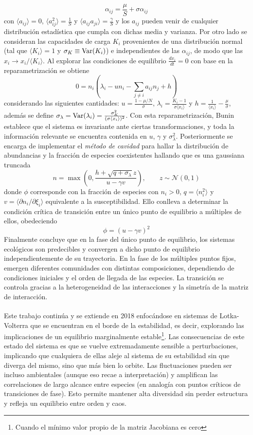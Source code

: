 $$\alpha_{ij}=\frac{\mu}{S}+\sigma\alpha_{ij}$$
con $\langle a_{ij}\rangle=0$, $\langle a_{ij}^2\rangle=\frac{1}{S}$ y $\langle a_{ij}a_{ji}\rangle=\frac{\gamma}{S}$ y los $a_{ij}$ pueden venir de cualquier distribución estadística que cumpla con dichas media y varianza. Por otro lado se consideran las capacidades de carga $K_i$ provenientes de una distribución normal (tal que $\langle K_i\rangle=1$ y $\sigma_K\equiv\mathrm{Var}(K_i)$) e independientes de las $\alpha_{ij}$, de modo que las $x_i\to x_i/\langle K_i\rangle$. Al explorar las condiciones de equilibrio $\frac{dx_i}{dt}=0$ con base en la reparametrización se obtiene
$$0=n_i\left (\lambda_i - un_i-\sum_{j\neq i}a_{ij}n_j + h\right) $$
considerando las siguientes cantidades: $u=\frac{1-\mu/N}{\sigma}$, $\lambda_i=\frac{K_i-1}{\sigma \langle x_i\rangle}$ y $h=\frac{1}{\langle x_i\rangle}-\frac{\mu}{\sigma}$, además se define $\sigma_\lambda=\mathrm{Var}(\lambda_i)=\frac{\sigma_K^2}{(\sigma\langle x_i\rangle)^2}$. Con esta reparametrización, Bunin establece que el sistema es invariante ante ciertas transformaciones, y toda la información relevante se encuentra contenida en $u$, $\gamma$ y $\sigma_\lambda^2$. Posteriormente se encarga de implementar el \textit{método de cavidad} para hallar la distribución de abundancias y la fracción de especies coexistentes hallando que es una gaussiana truncada
$$n=\max\left (0,\frac{h+\sqrt{q+\sigma_\lambda}z}{u-\gamma v}\right ),\qquad z\sim \mathcal{N}(0,1)$$
donde $\phi$ corresponde con la fracción de especies con $n_i>0$, $q=\langle n_i^2\rangle$ y $v=\langle\partial n_i/\partial \xi_i\rangle$ equivalente a la susceptibilidad. Ello conlleva a determinar la condición crítica de transición entre un único punto de equilibrio a múltiples de ellos, obedeciendo
$$\phi=(u-\gamma v)^2$$
Finalmente concluye que en la fase del único punto de equilibrio, los sistemas ecológicos son predecibles y convergen a dicho punto de equilibrio independientemente de su trayectoria. En la fase de los múltiples puntos fijos, emergen diferentes comunidades con distintas composiciones, dependiendo de condiciones iniciales y el orden de llegada de las especies. La transición se controla gracias a la heterogeneidad de las interacciones y la simetría de la matriz de interacción.\\
\\
Este trabajo continúa y se extiende en 2018 \cite{biroli2018marginally} enfocándose en sistemas de Lotka-Volterra que se encuentran en el borde de la estabilidad, es decir, explorando las implicaciones de un equilibrio marginalmente estable\footnote{Cuando el mínimo valor propio de la matriz Jacobiana es cero}. Las consecuencias de este estado del sistema es que se vuelve extremadamente sensible a perturbaciones, implicando que cualquiera de ellas aleje al sistema de su estabilidad sin que diverga del mismo, sino que más bien lo orbite. Las fluctuaciones pueden ser incluso ambientales (aunque eso recae a interpretación) y amplifican las correlaciones de largo alcance entre especies (en analogía con puntos críticos de transiciones de fase). Esto permite mantener alta diversidad sin perder estructura y refleja un equilibrio entre orden y caos.\\
